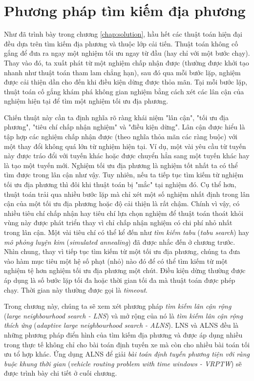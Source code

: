 \chapter{Phương pháp tìm kiếm địa phương}
\label{chap:search}

Như đã trình bày trong chương \ref{chap:solution}, hầu hết các thuật toán hiện đại đều dựa trên tìm kiếm địa phương và thuộc lớp cải tiến. Thuật toán không cố gắng để đưa ra ngay một nghiệm tối ưu ngay từ đầu (hay chỉ với một bước chạy). Thay vào đó, ta xuất phát từ một nghiệm chấp nhận được (thường được khởi tạo nhanh như thuật toán tham lam chẳng hạn), sau đó qua mỗi bước lặp, nghiệm được cải thiện dần cho đến khi điều kiện dừng được thỏa mãn. Tại mỗi bước lặp, thuật toán cố gắng khám phá không gian nghiệm bằng cách xét các lân cận của nghiệm hiện tại để tìm một nghiệm tối ưu địa phương. 

Chiến thuật này cần ta định nghĩa rõ ràng khái niệm "lân cận", "tối ưu địa phương", "tiêu chí chấp nhận nghiệm" và "điều kiện dừng". Lân cận được hiểu là tập hợp các nghiệm chấp nhận được (theo nghĩa thỏa mãn các ràng buộc) với một thay đổi không quá lớn từ nghiệm hiện tại. Ví dụ, một vài yêu cầu từ tuyến này được tráo đổi với tuyến khác hoặc được chuyển hẳn sang một tuyến khác hay là tạo một tuyến mới. Nghiệm tối ưu địa phương là nghiệm tốt nhất ta có thể tìm được trong lân cận như vậy. Tuy nhiên, nếu ta tiếp tục tìm kiếm từ nghiệm tối ưu địa phương thì đôi khi thuật toán bị "mắc" tại nghiệm đó. Cụ thể hơn, thuật toán trải qua nhiều bước lặp mà chỉ xét một số  nghiệm nhất định trong lân cận của một tối ưu địa phương hoặc độ cải thiện là rất chậm. Chính vì vậy, có nhiều tiêu chí chấp nhận hay tiêu chí lựa chọn nghiệm để thuật toán thoát khỏi vùng này được phát triển thay vì chỉ chấp nhận nghiệm có chi phí nhỏ nhất trong lân cận. Một vài tiêu chí có thể kể đến như \textit{tìm kiếm tabu} (\textit{tabu search}) hay \textit{mô phỏng luyện kim} (\textit{simulated annealing}) đã được nhắc đến ở chương trước. Nhìn chung, thay vì tiếp tục tìm kiếm từ một tối ưu địa phương, chúng ta đưa vào hàm mục tiêu một hệ số phạt (nhỏ) nào đó để có thể tìm kiếm từ một nghiệm tệ hơn nghiệm tối ưu địa phương một chút. Điều kiện dừng thường được áp dụng là số bước lặp tối đa hoặc thời gian tối đa mà thuật toán được phép chạy. Thời gian này thường được gọi là \textit{timeout}.

Trong chương này, chúng ta sẽ xem xét phương pháp \textit{tìm kiếm lân cận rộng} (\textit{large neighbourhood search - LNS}) và mở rộng của nó là \textit{tìm kiếm lân cận rộng thích ứng} (\textit{adaptive large neighbourhood search - ALNS}). LNS và ALNS đều là những phương pháp điển hình của tìm kiếm địa phương và được áp dụng nhiều trong thực tế không chỉ cho bài toán định tuyến xe mà còn cho nhiều bài toán tối ưu tổ hợp khác. Ứng dụng ALNS để giải \textit{bài toán định tuyến phương tiện với ràng buộc khung thời gian} (\textit{vehicle routing problem with time windows - VRPTW}) sẽ được trình bày chi tiết ở cuối chương.



